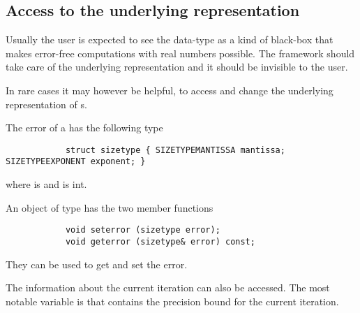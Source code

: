 	\subsection{Access to the underlying representation}
		Usually the user is expected to see the data-type \real as a kind of
    black-box that makes error-free computations with real numbers possible.
    The framework should take care of the underlying representation and it
    should be invisible to the user.

    In rare cases it may however be helpful, to access and change the
    underlying representation of {\real}s.
     
		The error of a \real has the following type
		\begin{verbatim}
			struct sizetype { SIZETYPEMANTISSA mantissa; SIZETYPEEXPONENT exponent; }
		\end{verbatim}
		where  is  and  is int.
		
		An object of type \real has the two member functions
		\begin{verbatim}
			void seterror (sizetype error);
			void geterror (sizetype& error) const;
		\end{verbatim}
    They can be used to get and set the error.
    
    The information about the current iteration can also be accessed.
    The most notable variable is  that
    contains the precision bound for the current iteration.
